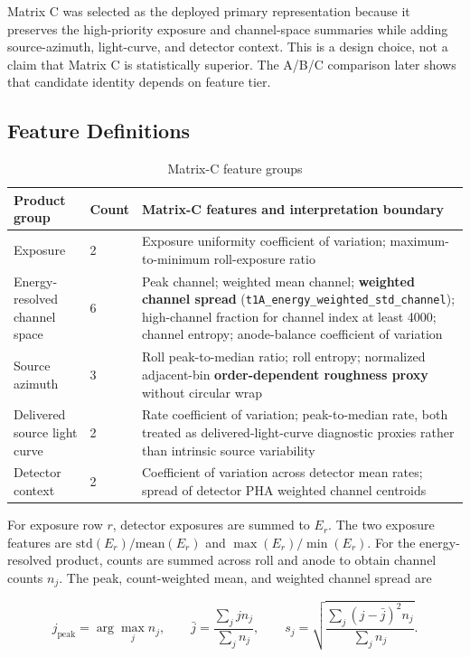 \documentclass[conference]{IEEEtran}
\begin{document}
Matrix C was selected as the deployed primary representation because it preserves the high-priority exposure and channel-space summaries while adding source-azimuth, light-curve, and detector context. This is a design choice, not a claim that Matrix C is statistically superior. The A/B/C comparison later shows that candidate identity depends on feature tier.


\subsection{Feature Definitions}

\begin{table}[t]
\centering
\caption{Matrix-C feature groups}
\label{tab:2}
\footnotesize
\begin{tabular}{p{}p{}p{}}
\toprule
Product group & Count & Matrix-C features and interpretation boundary \\
\midrule
Exposure & 2 & Exposure uniformity coefficient of variation; maximum-to-minimum roll-exposure ratio \\
Energy-resolved channel space & 6 & Peak channel; weighted mean channel; \textbf{weighted channel spread} (\texttt{t1A\_energy\_weighted\_std\_channel}); high-channel fraction for channel index at least 4000; channel entropy; anode-balance coefficient of variation \\
Source azimuth & 3 & Roll peak-to-median ratio; roll entropy; normalized adjacent-bin \textbf{order-dependent roughness proxy} without circular wrap \\
Delivered source light curve & 2 & Rate coefficient of variation; peak-to-median rate, both treated as delivered-light-curve diagnostic proxies rather than intrinsic source variability \\
Detector context & 2 & Coefficient of variation across detector mean rates; spread of detector PHA weighted channel centroids \\
\bottomrule
\end{tabular}
\end{table}

For exposure row $r$, detector exposures are summed to $E_r$. The two exposure features are $\mathrm{std}(E_r)/\mathrm{mean}(E_r)$ and $\max(E_r)/\min(E_r)$. For the energy-resolved product, counts are summed across roll and anode to obtain channel counts $n_j$. The peak, count-weighted mean, and weighted channel spread are


\begin{equation*}
j_{\mathrm{peak}}=\arg\max_j n_j,\qquad
\bar j=\frac{\sum_j jn_j}{\sum_j n_j},\qquad
s_j=\sqrt{\frac{\sum_j(j-\bar j)^2n_j}{\sum_jn_j}}.
\end{equation*}
\end{document}
